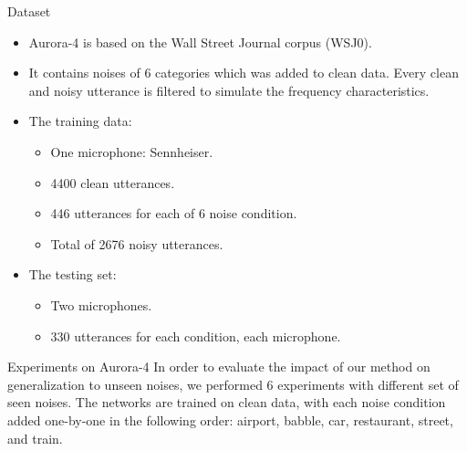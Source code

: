 \documentclass[final]{beamer}
\newlength{\onecolwid}
\newlength{\twocolwid}
\begin{document}
\begin{frame}[t]
\begin{columns}[t]
\begin{column}{\twocolwid}
\begin{columns}[t]
        \begin{column}{\onecolwid} %
            \begin{block}{\Large Dataset}
                \begin{itemize}
                    \item Aurora-4 is based on the Wall Street Journal corpus (WSJ0). 
                    \item It contains noises of 
                        6 categories which was added to clean data. Every clean and noisy utterance is 
                        filtered to simulate the frequency characteristics. 
                    \item The training data: 
                        \begin{itemize}
                            \item One microphone: Sennheiser.
                            \item 4400 clean utterances.
                            \item 446 utterances for each of 6 noise condition.
                            \item Total of 2676 noisy utterances.
                        \end{itemize}
                    \item The testing set:
                        \begin{itemize}
                            \item Two microphones.
                            \item 330 utterances for each condition, each microphone.
                        \end{itemize}
                \end{itemize}
            \end{block}

            \begin{block}{{\Large Experiments on Aurora-4}}
                In order to evaluate the impact of our method on generalization to unseen noises,
                we performed 6 experiments with different set of seen noises. The networks are trained
                on clean data, with each noise condition added one-by-one in the following order: airport, babble, car, 
                restaurant, street, and train.


\end{block}
\end{column}
\end{columns}
\end{column}
\end{columns}
\end{frame}
\end{document}
